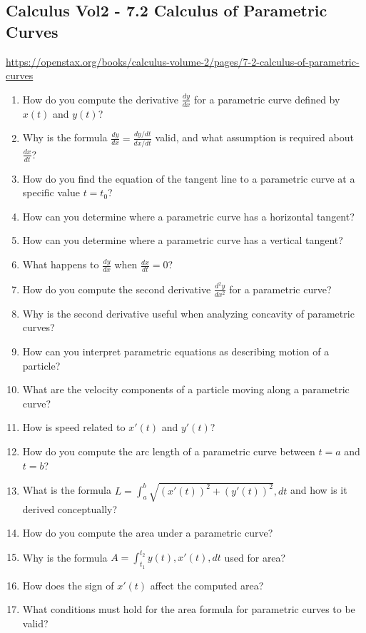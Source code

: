 \subsection{Calculus Vol2 - 7.2 Calculus of Parametric Curves}

\url{https://openstax.org/books/calculus-volume-2/pages/7-2-calculus-of-parametric-curves}

\begin{enumerate}
  \item How do you compute the derivative $\frac{dy}{dx}$ for a parametric curve defined by $x(t)$ and $y(t)$?
  \item Why is the formula $\frac{dy}{dx} = \frac{dy/dt}{dx/dt}$ valid, and what assumption is required about $\frac{dx}{dt}$?
  \item How do you find the equation of the tangent line to a parametric curve at a specific value $t=t_0$?
  \item How can you determine where a parametric curve has a horizontal tangent?
  \item How can you determine where a parametric curve has a vertical tangent?
  \item What happens to $\frac{dy}{dx}$ when $\frac{dx}{dt} = 0$?
  \item How do you compute the second derivative $\frac{d^2 y}{dx^2}$ for a parametric curve?
  \item Why is the second derivative useful when analyzing concavity of parametric curves?
  \item How can you interpret parametric equations as describing motion of a particle?
  \item What are the velocity components of a particle moving along a parametric curve?
  \item How is speed related to $x'(t)$ and $y'(t)$?
  \item How do you compute the arc length of a parametric curve between $t=a$ and $t=b$?
  \item What is the formula $L = \int_a^b \sqrt{(x'(t))^2 + (y'(t))^2},dt$ and how is it derived conceptually?
  \item How do you compute the area under a parametric curve?
  \item Why is the formula $A = \int_{t_1}^{t_2} y(t),x'(t),dt$ used for area?
  \item How does the sign of $x'(t)$ affect the computed area?
  \item What conditions must hold for the area formula for parametric curves to be valid?

\end{enumerate}
